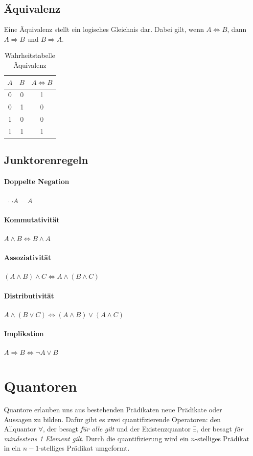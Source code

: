 \documentclass{article}
\begin{document}
\subsection{Äquivalenz}
Eine Äquivalenz stellt ein logisches Gleichnis dar. Dabei gilt, wenn \(A \Leftrightarrow B\), dann \(A \Rightarrow B\) und \(B \Rightarrow A\).
\begin{table}[h!]
		\begin{center}
				\caption{Wahrheitstabelle Äquivalenz}
				\label{tab:}
				\begin{tabular}{c c|c}
						\(A\) & \(B\) & \(A \Leftrightarrow B\) \\
						\hline
						0 & 0 & 1\\
						0 & 1 & 0\\
						1 & 0 & 0\\
						1 & 1 & 1\\
				\end{tabular}
		\end{center}
\end{table}
\subsection{Junktorenregeln}
\paragraph{Doppelte Negation}\(\neg \neg A = A\)
\paragraph{Kommutativität} \(A \wedge B \Leftrightarrow B \wedge A\)
\paragraph{Assoziativität} \((A \wedge B) \wedge C \Leftrightarrow A \wedge (B \wedge C)\)
\paragraph{Distributivität} \(A \wedge (B \vee C) \Leftrightarrow (A \wedge B) \vee (A \wedge C)\)
\paragraph{Implikation} \(A \Rightarrow B \Leftrightarrow \neg A \lor B\)

\section{Quantoren}
Quantore erlauben uns aus bestehenden Prädikaten neue Prädikate oder Aussagen zu bilden. Dafür gibt es zwei quantifizierende Operatoren: den Allquantor \(\forall\), der besagt \textit{für alle gilt} und der Existenzquantor \(\exists\), der besagt \textit{für mindestens 1 Element gilt}. Durch die quantifizierung wird ein \(n\)-stelliges Prädikat in ein \(n-1\)-stelliges Prädikat umgeformt.
\end{document}
